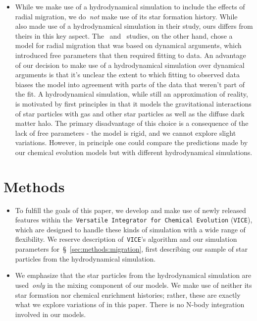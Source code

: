 \documentclass[fleqn, usenatbib]{mnras}
\begin{document}
\begin{itemize}
\begin{itemize}
		\item While we make use of a hydrodynamical simulation to include the 
		effects of radial migration, we do~\textit{not} make use of its star 
		formation history. While~\citet{Minchev2013} also made use of a 
		hydrodynamical simulation in their study, ours differs from theirs in 
		this key aspect. The~\citet{Schoenrich2009} and~\citet{Sharma2020} 
		studies, on the other hand, chose a model for radial migration that was 
		based on dynamical arguments, which introduced free parameters that 
		then required fitting to data. An advantage of our decision to make use 
		of a hydrodynamical simulation over dynamical arguments is that it's 
		unclear the extent to which fitting to observed data biases the model 
		into agreement with parts of the data that weren't part of the fit. A 
		hydrodynamical simulation, while still an approximation of reality, 
		is motivated by first principles in that it models the gravitational 
		interactions of star particles with gas and other star particles as 
		well as the diffuse dark matter halo. The primary disadvantage of this 
		choice is a consequence of the lack of free parameters - the model is 
		rigid, and we cannot explore slight variations. However, in principle 
		one could compare the predictions made by our chemical evolution models 
		but with different hydrodynamical simulations. 
	\end{itemize} 

\end{itemize} 

\section{Methods} 
\label{sec:methods} 

\begin{itemize} 
	\item To fulfill the goals of this paper, we develop and make use of 
	newly released features within the~\texttt{Versatile Integrator for 
	Chemical Evolution} (\texttt{VICE}), which are designed to handle these 
	kinds of simulation with a wide range of flexibility. We reserve 
	description of~\texttt{VICE}'s algorithm and our simulation parameters 
	for~\S~\ref{sec:methods:migration}, first describing our sample of star 
	particles from the hydrodynamical simulation. 

	\item We emphasize that the star particles from the hydrodynamical 
	simulation are used~\textit{only} in the mixing component of our models. 
	We make use of neither its star formation nor chemical enrichment 
	histories; rather, these are exactly what we explore variations of in this 
	paper. There is no N-body integration involved in our models. 
\end{itemize} 
\end{document}

